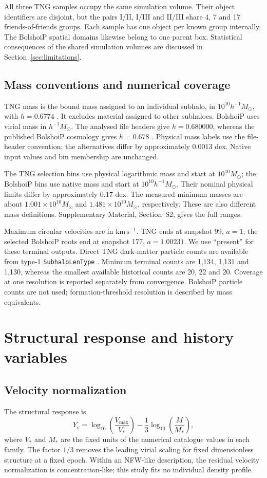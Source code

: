 \documentclass[11pt,a4paper]{article}
\begin{document}
All three TNG samples occupy the same simulation volume. Their object identifiers are disjoint, but the pairs I/II, I/III and II/III share 4, 7 and 17 friends-of-friends groups. Each sample has one object per known group internally. The BolshoiP spatial domains likewise belong to one parent box. Statistical consequences of the shared simulation volumes are discussed in Section~\ref{sec:limitations}.

\subsection{Mass conventions and numerical coverage}
TNG mass is the bound mass assigned to an individual subhalo, in $10^{10}h^{-1}M_\odot$, with $h=0.6774$ \citep{TNGSpec,TNGDownload}. It excludes material assigned to other subhaloes. BolshoiP uses virial mass in $h^{-1}M_\odot$. The analysed file headers give $h=0.680000$, whereas the published BolshoiP cosmology gives $h=0.678$ \citep{TAO}. Physical mass labels use the file-header convention; the alternatives differ by approximately $0.0013$ dex. Native input values and bin membership are unchanged.

The TNG selection bins use physical logarithmic mass and start at $10^{10}M_\odot$; the BolshoiP bins use native mass and start at $10^{10}h^{-1}M_\odot$. Their nominal physical limits differ by approximately $0.17$ dex. The measured minimum masses are about $1.001\times10^{10}M_\odot$ and $1.481\times10^{10}M_\odot$, respectively. These are also different mass definitions. Supplementary Material, Section~S2, gives the full ranges.

Maximum circular velocities are in $\mathrm{km\,s^{-1}}$. TNG ends at snapshot 99, $a=1$; the selected BolshoiP roots end at snapshot 177, $a=1.00231$. We use ``present'' for these terminal outputs. Direct TNG dark-matter particle counts are available from type-1 \texttt{SubhaloLenType} \citep{TNGSpec}. Minimum terminal counts are 1,134, 1,131 and 1,130, whereas the smallest available historical counts are 20, 22 and 20. Coverage at one resolution is reported separately from convergence. BolshoiP particle counts are not used; formation-threshold resolution is described by mass equivalents.

\section{Structural response and history variables}
\subsection{Velocity normalization}
The structural response is
\begin{equation}
Y_v=\log_{10}\!\left(\frac{V_{\max}}{V_*}\right)-\frac13\log_{10}\!\left(\frac{M}{M_*}\right),\label{eq:target}
\end{equation}
where $V_*$ and $M_*$ are the fixed units of the numerical catalogue values in each family. The factor $1/3$ removes the leading virial scaling for fixed dimensionless structure at a fixed epoch. Within an NFW-like description, the residual velocity normalization is concentration-like; this study fits no individual density profile.
\end{document}
